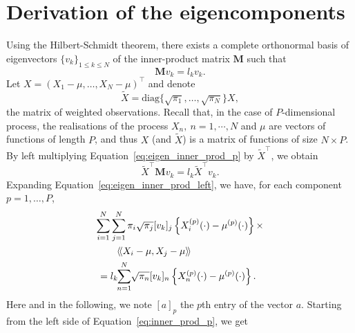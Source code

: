 \section{Derivation of the eigencomponents} %
\label{sec:derivation_of_the_eigencomponents}

Using the Hilbert-Schmidt theorem, there exists a complete orthonormal basis of eigenvectors $\{v_k\}_{1 \leq k \leq N}$ of the inner-product matrix $\mathbf{M}$ such that
\begin{equation}\label{eq:eigen_inner_prod_p}
    \mathbf{M}v_k = l_kv_k.
\end{equation}
Let $X = \left(X_1 - \mu, \dots, X_N - \mu\right)^\top$ and denote
\begin{equation}
    \widetilde{X} = \text{diag}\{\sqrt{\pi_1}, \dots, \sqrt{\pi_N}\}X,
\end{equation}
the matrix of weighted observations. Recall that, in the case of $P$-dimensional process, the realisations of the process $X_n,~n = 1, \cdots, N$ and $\mu$ are vectors of functions of length $P$, and thus $X$ (and $\widetilde{X}$) is a matrix of functions of size $N \times P$. By left multiplying Equation~\eqref{eq:eigen_inner_prod_p} by $\widetilde{X}^\top$, we obtain
\begin{equation}\label{eq:eigen_inner_prod_left}
    \widetilde{X}^\top \mathbf{M} v_k = l_k \widetilde{X}^\top v_k.
\end{equation} 
Expanding Equation~\eqref{eq:eigen_inner_prod_left}, we have, for each component $p = 1, \dots, P$,
\begin{align}\label{eq:inner_prod_p}
    \sum_{i = 1}^N \sum_{j = 1}^N \pi_i & \sqrt{\pi_j}[v_{k}]_j \left\{X_i^{(p)}(\cdot) - \mu^{(p)}(\cdot)\right\} \times \\ 
    &\mkern-36mu \inH{X_i - \mu}{X_j - \mu} \\
    &\mkern-72mu = l_k \mkern-5mu\sum_{n = 1}^N \mkern-4mu\sqrt{\pi_n}[v_{k}]_n\left\{\Xnp(\cdot) - \mu^{(p)}(\cdot)\right\}.
\end{align}
Here and in the following, we note $[a]_p$ the $p$th entry of the vector $a$. Starting from the left side of Equation~\eqref{eq:inner_prod_p}, we get
